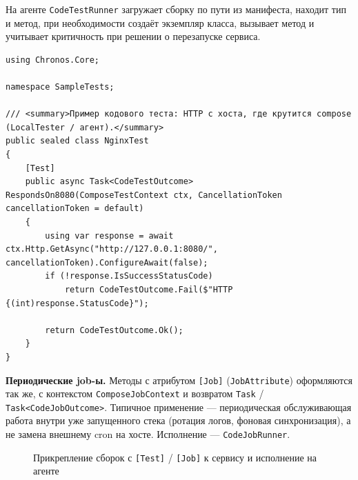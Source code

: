 На агенте \texttt{CodeTestRunner} загружает сборку по пути из манифеста, находит тип и метод, при необходимости создаёт экземпляр класса, вызывает метод и учитывает критичность при решении о перезапуске сервиса.

\begin{lstlisting}[style=code,caption={Пример кодового теста с атрибутом \texttt{[Test]} (сканирование и вызов на агенте)}]
using Chronos.Core;

namespace SampleTests;

/// <summary>Пример кодового теста: HTTP с хоста, где крутится compose (LocalTester / агент).</summary>
public sealed class NginxTest
{
    [Test]
    public async Task<CodeTestOutcome> RespondsOn8080(ComposeTestContext ctx, CancellationToken cancellationToken = default)
    {
        using var response = await ctx.Http.GetAsync("http://127.0.0.1:8080/", cancellationToken).ConfigureAwait(false);
        if (!response.IsSuccessStatusCode)
            return CodeTestOutcome.Fail($"HTTP {(int)response.StatusCode}");

        return CodeTestOutcome.Ok();
    }
}
\end{lstlisting}

\textbf{Периодические job-ы.} Методы с атрибутом \texttt{[Job]} (\texttt{JobAttribute}) оформляются так же, с контекстом \texttt{ComposeJobContext} и возвратом \texttt{Task} / \texttt{Task<CodeJobOutcome>}. Типичное применение --- периодическая обслуживающая работа внутри уже запущенного стека (ротация логов, фоновая синхронизация), а не замена внешнему cron на хосте. Исполнение --- \texttt{CodeJobRunner}.

\begin{figure}[!ht]
\vspace{2mm}
\centering
{}%
\vspace{3mm}
\caption{Прикрепление сборок с \texttt{[Test]} / \texttt{[Job]} к сервису и исполнение на агенте}
\label{fig:test-job-pipeline}
\end{figure}

